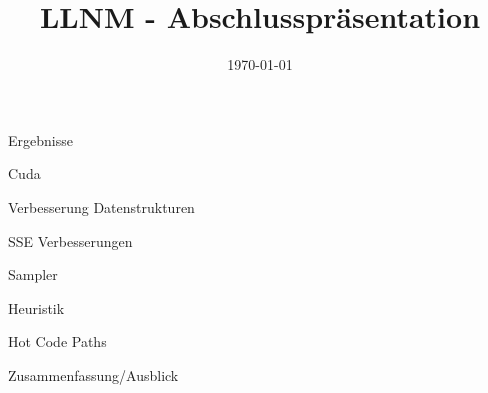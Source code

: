 


\title[LLNM]{LLNM - Abschlusspräsentation}
\subtitle{}
\date{\today}

	\begin{frame}
		\titlepage
	\end{frame}
	\begin{frame}{Ergebnisse}
	\end{frame}
	\begin{frame}{Cuda}
	\end{frame}
	\begin{frame}{Verbesserung Datenstrukturen}
	\end{frame}

	\begin{frame}{SSE Verbesserungen}
	\end{frame}
	\begin{frame}{Sampler}
	\end{frame}
	\begin{frame}{Heuristik}
	\end{frame}

	\begin{frame}{Hot Code Paths}
	\end{frame}

	\begin{frame}{Zusammenfassung/Ausblick}
		
	\end{frame}


